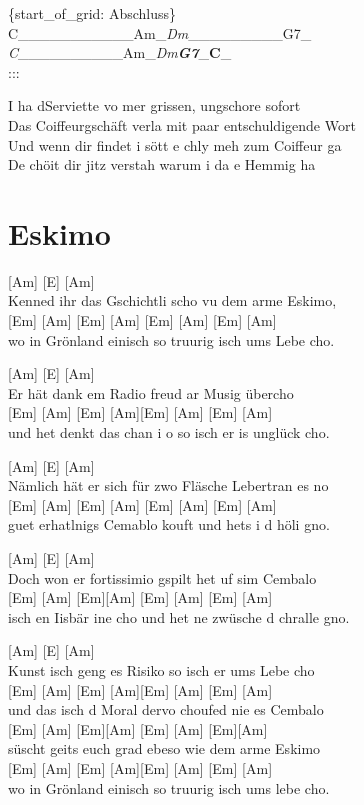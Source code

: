 \documentclass[
  letterpaper,
]{scrbook}
\begin{document}
\{start\_of\_grid: Abschluss\}\\
\textbar C\_\_\_\_\_\_\_\textbar\_\_\_\_Am\_\emph{\textbar Dm}\_\_\_\_\_\textbar\_\_\_\_G7\_\emph{\textbar{}\\
\textbar C}\_\_\_\_\_\_\textbar\_\_\_\_Am\_\emph{\textbar Dm\textbf{G7}\textbar{}}\_\textbf{C}\_\textbar{}\\
:::

I ha d\textquotesingle Serviette vo mer grissen, ungschore sofort\\
Das Coiffeurgschäft verla mit paar entschuldigende Wort\\
Und wenn dir findet i sött e chly meh zum Coiffeur ga\\
De chöit dir jitz verstah warum i da e Hemmig ha

\hypertarget{eskimo}{%
\chapter{Eskimo}\label{eskimo}}

{[}Am{]} {[}E{]} {[}Am{]}\\
Kenned ihr das Gschichtli scho vu dem arme Eskimo,\\
{[}Em{]} {[}Am{]} {[}Em{]} {[}Am{]} {[}Em{]} {[}Am{]} {[}Em{]}
{[}Am{]}\\
wo in Grönland einisch so truurig isch ums Lebe cho.

{[}Am{]} {[}E{]} {[}Am{]}\\
Er hät dank em Radio freud ar Musig übercho\\
{[}Em{]} {[}Am{]} {[}Em{]} {[}Am{]}{[}Em{]} {[}Am{]} {[}Em{]} {[}Am{]}\\
und het denkt das chan i o so isch er is unglück cho.

{[}Am{]} {[}E{]} {[}Am{]}\\
Nämlich hät er sich für zwo Fläsche Lebertran es no\\
{[}Em{]} {[}Am{]} {[}Em{]} {[}Am{]} {[}Em{]} {[}Am{]} {[}Em{]}
{[}Am{]}\\
guet erhatlnigs Cemablo kouft und hets i d höli gno.

{[}Am{]} {[}E{]} {[}Am{]}\\
Doch won er fortissimio gspilt het uf sim Cembalo\\
{[}Em{]} {[}Am{]} {[}Em{]}{[}Am{]} {[}Em{]} {[}Am{]} {[}Em{]} {[}Am{]}\\
isch en Iisbär ine cho und het ne zwüsche d chralle gno.

{[}Am{]} {[}E{]} {[}Am{]}\\
Kunst isch geng es Risiko so isch er ums Lebe cho\\
{[}Em{]} {[}Am{]} {[}Em{]} {[}Am{]}{[}Em{]} {[}Am{]} {[}Em{]} {[}Am{]}\\
und das isch d Moral dervo choufed nie es Cembalo\\
{[}Em{]} {[}Am{]} {[}Em{]}{[}Am{]} {[}Em{]} {[}Am{]} {[}Em{]}{[}Am{]}\\
süscht geits euch grad ebeso wie dem arme Eskimo\\
{[}Em{]} {[}Am{]} {[}Em{]} {[}Am{]}{[}Em{]} {[}Am{]} {[}Em{]} {[}Am{]}\\
wo in Grönland einisch so truurig isch ums lebe cho.
\end{document}
